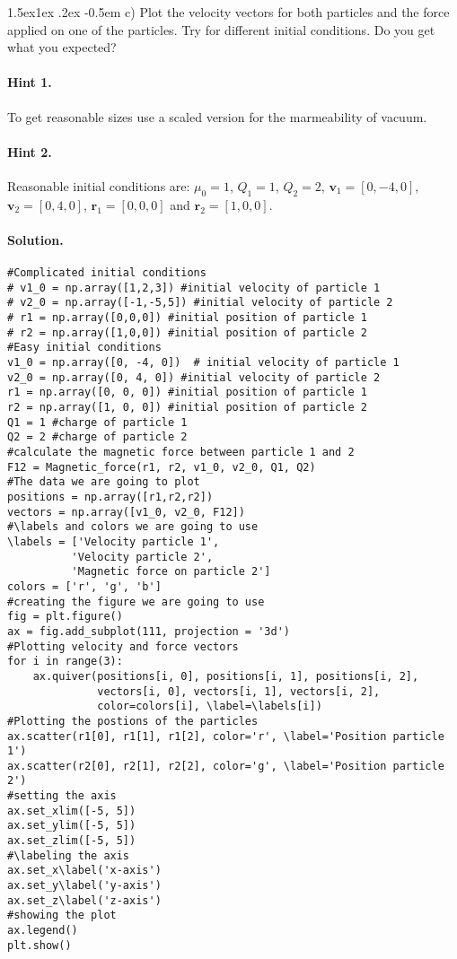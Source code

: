 \documentclass[%
oneside,                 %
final,                   %
10pt]{article}
\makeatletter
\newenvironment{doconceexercise}{}{}
\newcommand\subex{\@startsection{paragraph}{4}{\z@}%
                  {1.5ex\@plus1ex \@minus.2ex}%
                  {-0.5em}%
                  {\normalfont\normalsize\bfseries}}
\makeatother
\begin{document}
\begin{doconceexercise}

\subex{c)}
Plot the velocity vectors for both particles and the force applied on one of the particles. Try for different initial conditions. Do you get what you expected?


\paragraph{Hint 1.}
To get reasonable sizes use a scaled version for the marmeability of vacuum.



\paragraph{Hint 2.}
Reasonable initial conditions are: $\mu_0 = 1$, $Q_1 = 1$, $Q_2=2$, $\mathbf{v}_1=[0, -4, 0]$, $\mathbf{v}_2=[0, 4, 0]$, $\mathbf{r}_1=[0, 0, 0]$ and $\mathbf{r}_2=[1, 0, 0]$.



\paragraph{Solution.}
\begin{verbatim}
#Complicated initial conditions
# v1_0 = np.array([1,2,3]) #initial velocity of particle 1
# v2_0 = np.array([-1,-5,5]) #initial velocity of particle 2
# r1 = np.array([0,0,0]) #initial position of particle 1
# r2 = np.array([1,0,0]) #initial position of particle 2
#Easy initial conditions
v1_0 = np.array([0, -4, 0])  # initial velocity of particle 1
v2_0 = np.array([0, 4, 0]) #initial velocity of particle 2
r1 = np.array([0, 0, 0]) #initial position of particle 1
r2 = np.array([1, 0, 0]) #initial position of particle 2
Q1 = 1 #charge of particle 1
Q2 = 2 #charge of particle 2
#calculate the magnetic force between particle 1 and 2
F12 = Magnetic_force(r1, r2, v1_0, v2_0, Q1, Q2)
#The data we are going to plot
positions = np.array([r1,r2,r2])
vectors = np.array([v1_0, v2_0, F12])
#\labels and colors we are going to use
\labels = ['Velocity particle 1', 
          'Velocity particle 2',
          'Magnetic force on particle 2']
colors = ['r', 'g', 'b']
#creating the figure we are going to use
fig = plt.figure()
ax = fig.add_subplot(111, projection = '3d')
#Plotting velocity and force vectors
for i in range(3):
    ax.quiver(positions[i, 0], positions[i, 1], positions[i, 2],
              vectors[i, 0], vectors[i, 1], vectors[i, 2], 
              color=colors[i], \label=\labels[i])
#Plotting the postions of the particles
ax.scatter(r1[0], r1[1], r1[2], color='r', \label='Position particle 1')
ax.scatter(r2[0], r2[1], r2[2], color='g', \label='Position particle 2')
#setting the axis
ax.set_xlim([-5, 5])
ax.set_ylim([-5, 5])
ax.set_zlim([-5, 5])
#\labeling the axis
ax.set_x\label('x-axis')
ax.set_y\label('y-axis')
ax.set_z\label('z-axis')
#showing the plot
ax.legend()
plt.show()
\end{verbatim}


\end{doconceexercise}
\end{document}
